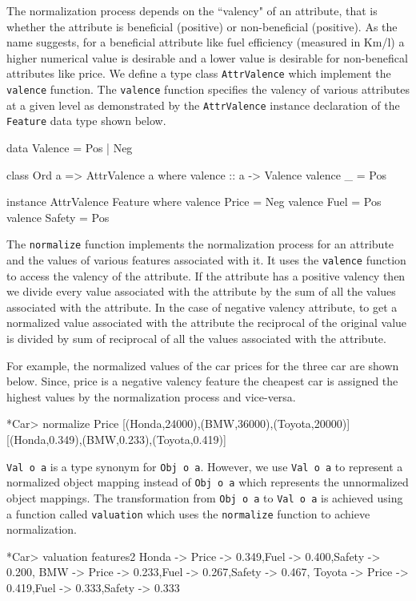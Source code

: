 \documentclass{jfp}
\newcommand{\prog}[1]{\texttt{#1}}
\begin{document}
The normalization process depends on the ``valency" of an attribute, that is whether the attribute is beneficial (positive) or non-beneficial (positive). As the name suggests, for a beneficial attribute like fuel efficiency (measured in Km/l) a higher numerical value is desirable and a lower value is desirable for non-benefical attributes like price. We define a type class \prog{AttrValence} which implement the \prog{valence} function. The \prog{valence} function specifies the valency of various attributes at a given level as demonstrated by the \prog{AttrValence} instance declaration of the \prog{Feature} data type shown below. 
\begin{haskellcode}
data Valence = Pos | Neg

class Ord a => AttrValence a where
   valence :: a -> Valence
   valence _ = Pos

instance AttrValence Feature where
   valence Price  = Neg
   valence Fuel   = Pos
   valence Safety = Pos
\end{haskellcode}
The \prog{normalize} function implements the normalization process for an attribute and the values of various features associated with it. It uses the \prog{valence} function to access the valency of the attribute. If the attribute has a positive valency then we divide every value associated with the attribute by the sum of all the values associated with the attribute. In the case of negative valency attribute, to get a normalized value associated with the attribute the reciprocal of the original value is divided by sum of reciprocal of all the values associated with the attribute. 
For example, the normalized values of the car prices for the three car are shown below. Since, price is a negative valency feature the cheapest car is assigned the highest values by the normalization process and vice-versa.
\begin{haskellcode}
*Car> normalize Price [(Honda,24000),(BMW,36000),(Toyota,20000)]
[(Honda,0.349),(BMW,0.233),(Toyota,0.419)]
\end{haskellcode}
\prog{Val o a} is a type synonym for \prog{Obj o a}. However, we use \prog{Val o a} to represent a normalized object mapping instead of \prog{Obj o a} which represents the unnormalized object mappings. The transformation from \prog{Obj o a} to \prog{Val o a} is achieved using a function called \prog{valuation} which uses the \prog{normalize} function to achieve normalization.
\begin{haskellcode}
*Car> valuation features2
{Honda -> {Price -> 0.349,Fuel -> 0.400,Safety -> 0.200},
 BMW -> {Price -> 0.233,Fuel -> 0.267,Safety -> 0.467},
 Toyota -> {Price -> 0.419,Fuel -> 0.333,Safety -> 0.333}}
\end{haskellcode}
\end{document}
